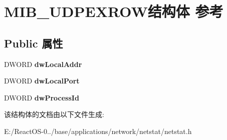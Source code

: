 \hypertarget{struct_m_i_b___u_d_p_e_x_r_o_w}{}\section{M\+I\+B\+\_\+\+U\+D\+P\+E\+X\+R\+O\+W结构体 参考}
\label{struct_m_i_b___u_d_p_e_x_r_o_w}
\subsection*{Public 属性}
\begin{DoxyCompactItemize}
\item 
\mbox{\label{struct_m_i_b___u_d_p_e_x_r_o_w_a2efc612fc678baa4970732edfdd55144}} 
D\+W\+O\+RD {\bfseries dw\+Local\+Addr}
\item 
\mbox{\label{struct_m_i_b___u_d_p_e_x_r_o_w_ab7403e11fd7e41cfac71d9ada0e80b77}} 
D\+W\+O\+RD {\bfseries dw\+Local\+Port}
\item 
\mbox{\label{struct_m_i_b___u_d_p_e_x_r_o_w_a0d2ff2d938f793ee4d4c403ef62cc42a}} 
D\+W\+O\+RD {\bfseries dw\+Process\+Id}
\end{DoxyCompactItemize}


该结构体的文档由以下文件生成\+:\begin{DoxyCompactItemize}
\item 
E\+:/\+React\+O\+S-\/0../base/applications/network/netstat/netstat.\+h\end{DoxyCompactItemize}
